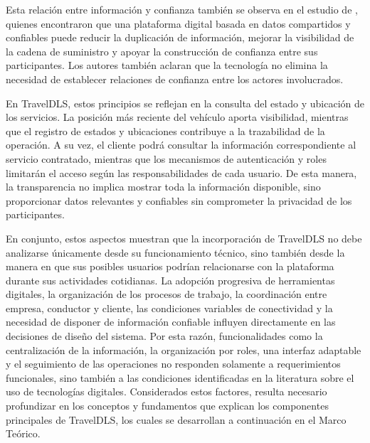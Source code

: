 Esta relación entre información y confianza también se observa en el estudio de \textcite{brookbanks2022impact}, quienes encontraron que una plataforma digital basada en datos compartidos y confiables puede reducir la duplicación de información, mejorar la visibilidad de la cadena de suministro y apoyar la construcción de confianza entre sus participantes. Los autores también aclaran que la tecnología no elimina la necesidad de establecer relaciones de confianza entre los actores involucrados.

En TravelDLS, estos principios se reflejan en la consulta del estado y ubicación de los servicios. La posición más reciente del vehículo aporta visibilidad, mientras que el registro de estados y ubicaciones contribuye a la trazabilidad de la operación. A su vez, el cliente podrá consultar la información correspondiente al servicio contratado, mientras que los mecanismos de autenticación y roles limitarán el acceso según las responsabilidades de cada usuario. De esta manera, la transparencia no implica mostrar toda la información disponible, sino proporcionar datos relevantes y confiables sin comprometer la privacidad de los participantes.

En conjunto, estos aspectos muestran que la incorporación de TravelDLS no debe analizarse únicamente desde su funcionamiento técnico, sino también desde la manera en que sus posibles usuarios podrían relacionarse con la plataforma durante sus actividades cotidianas. La adopción progresiva de herramientas digitales, la organización de los procesos de trabajo, la coordinación entre empresa, conductor y cliente, las condiciones variables de conectividad y la necesidad de disponer de información confiable influyen directamente en las decisiones de diseño del sistema. Por esta razón, funcionalidades como la centralización de la información, la organización por roles, una interfaz adaptable y el seguimiento de las operaciones no responden solamente a requerimientos funcionales, sino también a las condiciones identificadas en la literatura sobre el uso de tecnologías digitales. Considerados estos factores, resulta necesario profundizar en los conceptos y fundamentos que explican los componentes principales de TravelDLS, los cuales se desarrollan a continuación en el Marco Teórico.

